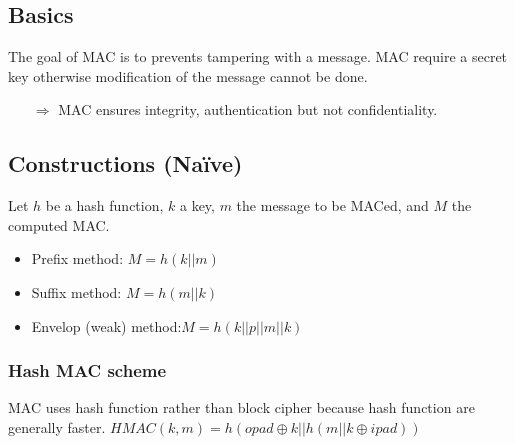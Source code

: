 
\subsection{Basics}
The goal of MAC is to prevents tampering with a message. MAC require a secret
key otherwise modification of the message cannot be done. 
\begin{itemize}
    \item[$\Rightarrow$] MAC ensures integrity, authentication but not confidentiality.
\end{itemize}

\subsection{Constructions (Naïve)}
Let $h$ be a hash function, $k$ a key, $m$ the message to be MACed, and $M$ the
computed MAC.
\begin{itemize}
    \item Prefix method: $ M = h(k||m) $
    \item Suffix method: $ M = h(m||k) $
    \item Envelop (weak) method:$ M = h(k||p||m||k) $
\end{itemize}

\subsubsection{Hash MAC scheme}
MAC uses hash function rather than block cipher because hash function are
generally faster.
$HMAC(k,m) = h(opad \oplus k || h(m||k\oplus ipad))$

